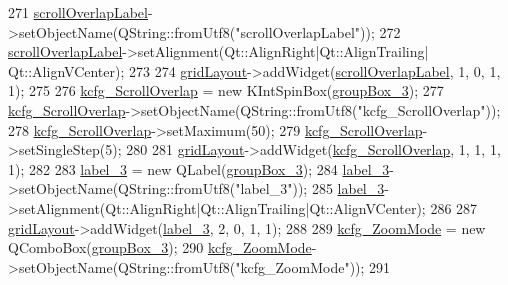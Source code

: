 \begin{DoxyCode}
271         \hyperlink{classUi__DlgGeneralBase_afd8162f00985b598c6b44fea18d59add}{scrollOverlapLabel}->setObjectName(QString::fromUtf8(\textcolor{stringliteral}{"scrollOverlapLabel"}));
272         \hyperlink{classUi__DlgGeneralBase_afd8162f00985b598c6b44fea18d59add}{scrollOverlapLabel}->setAlignment(Qt::AlignRight|Qt::AlignTrailing|
      Qt::AlignVCenter);
273 
274         \hyperlink{classUi__DlgGeneralBase_ae149cf7331bb8bdd9c3f8dabdde003e4}{gridLayout}->addWidget(\hyperlink{classUi__DlgGeneralBase_afd8162f00985b598c6b44fea18d59add}{scrollOverlapLabel}, 1, 0, 1, 1);
275 
276         \hyperlink{classUi__DlgGeneralBase_aa5ddc567f8fc39c1a159749c0c4bd718}{kcfg\_ScrollOverlap} = \textcolor{keyword}{new} KIntSpinBox(\hyperlink{classUi__DlgGeneralBase_a14484da34e83830a42cd4929ba2c7d86}{groupBox\_3});
277         \hyperlink{classUi__DlgGeneralBase_aa5ddc567f8fc39c1a159749c0c4bd718}{kcfg\_ScrollOverlap}->setObjectName(QString::fromUtf8(\textcolor{stringliteral}{"kcfg\_ScrollOverlap"}));
278         \hyperlink{classUi__DlgGeneralBase_aa5ddc567f8fc39c1a159749c0c4bd718}{kcfg\_ScrollOverlap}->setMaximum(50);
279         \hyperlink{classUi__DlgGeneralBase_aa5ddc567f8fc39c1a159749c0c4bd718}{kcfg\_ScrollOverlap}->setSingleStep(5);
280 
281         \hyperlink{classUi__DlgGeneralBase_ae149cf7331bb8bdd9c3f8dabdde003e4}{gridLayout}->addWidget(\hyperlink{classUi__DlgGeneralBase_aa5ddc567f8fc39c1a159749c0c4bd718}{kcfg\_ScrollOverlap}, 1, 1, 1, 1);
282 
283         \hyperlink{classUi__DlgGeneralBase_a0b095fda3a8dd7228b68c9fe8515afe3}{label\_3} = \textcolor{keyword}{new} QLabel(\hyperlink{classUi__DlgGeneralBase_a14484da34e83830a42cd4929ba2c7d86}{groupBox\_3});
284         \hyperlink{classUi__DlgGeneralBase_a0b095fda3a8dd7228b68c9fe8515afe3}{label\_3}->setObjectName(QString::fromUtf8(\textcolor{stringliteral}{"label\_3"}));
285         \hyperlink{classUi__DlgGeneralBase_a0b095fda3a8dd7228b68c9fe8515afe3}{label\_3}->setAlignment(Qt::AlignRight|Qt::AlignTrailing|Qt::AlignVCenter);
286 
287         \hyperlink{classUi__DlgGeneralBase_ae149cf7331bb8bdd9c3f8dabdde003e4}{gridLayout}->addWidget(\hyperlink{classUi__DlgGeneralBase_a0b095fda3a8dd7228b68c9fe8515afe3}{label\_3}, 2, 0, 1, 1);
288 
289         \hyperlink{classUi__DlgGeneralBase_af20043c0fdfcbff439c8741e096ac60a}{kcfg\_ZoomMode} = \textcolor{keyword}{new} QComboBox(\hyperlink{classUi__DlgGeneralBase_a14484da34e83830a42cd4929ba2c7d86}{groupBox\_3});
290         \hyperlink{classUi__DlgGeneralBase_af20043c0fdfcbff439c8741e096ac60a}{kcfg\_ZoomMode}->setObjectName(QString::fromUtf8(\textcolor{stringliteral}{"kcfg\_ZoomMode"}));
291 

\end{DoxyCode}
